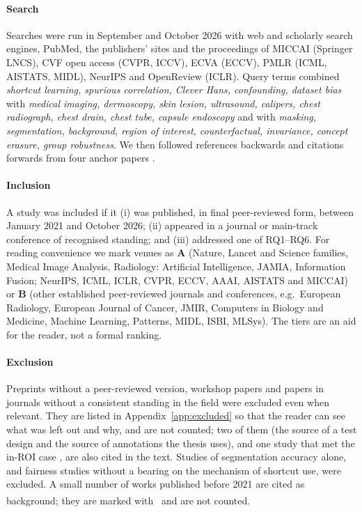 \documentclass[11pt,a4paper]{article}
\newcommand{\bg}{\textsuperscript{\dag}}
\begin{document}
\paragraph{Search} Searches were run in September and October 2026 with web and scholarly search engines, PubMed, the
publishers' sites and the proceedings of MICCAI (Springer LNCS), CVF open access (CVPR, ICCV), ECVA (ECCV), PMLR (ICML,
AISTATS, MIDL), NeurIPS and OpenReview (ICLR). Query terms combined \emph{shortcut learning, spurious correlation,
Clever Hans, confounding, dataset bias} with \emph{medical imaging, dermoscopy, skin lesion, ultrasound, calipers,
chest radiograph, chest drain, chest tube, capsule endoscopy} and with \emph{masking, segmentation, background,
region of interest, counterfactual, invariance, concept erasure, group robustness}. We then followed references
backwards and citations forwards from four anchor papers \citep{degrave2021ai,brown2023shortcut,jimenez2023shortcuts,sourget2025mask}.

\paragraph{Inclusion} A study was included if it (i) was published, in final peer-reviewed form, between January 2021
and October 2026; (ii) appeared in a journal or main-track conference of recognised standing; and (iii) addressed one
of RQ1--RQ6. For reading convenience we mark venues as \textbf{A} (Nature, Lancet and Science families, Medical Image
Analysis, Radiology: Artificial Intelligence, JAMIA, Information Fusion; NeurIPS, ICML, ICLR, CVPR, ECCV, AAAI, AISTATS
and MICCAI) or \textbf{B} (other established peer-reviewed journals and conferences, e.g.\ European Radiology, European
Journal of Cancer, JMIR, Computers in Biology and Medicine, Machine Learning, Patterns, MIDL, ISBI, MLSys). The tiers
are an aid for the reader, not a formal ranking.

\paragraph{Exclusion} Preprints without a peer-reviewed version, workshop papers and papers in journals without a
consistent standing in the field were excluded even when relevant. They are listed in
Appendix~\ref{app:excluded} so that the reader can see what was left out and why, and are not counted; two of them
(the source of a test design and the source of annotations the thesis uses), and one study that met the in-ROI
case \citep{nauta2022uncovering}, are also cited in the text. Studies of segmentation accuracy
alone, and fairness studies without a bearing on the mechanism of shortcut use, were excluded. A small number of works
published before 2021 are cited as background; they are marked with \bg\ and are not counted.
\end{document}
